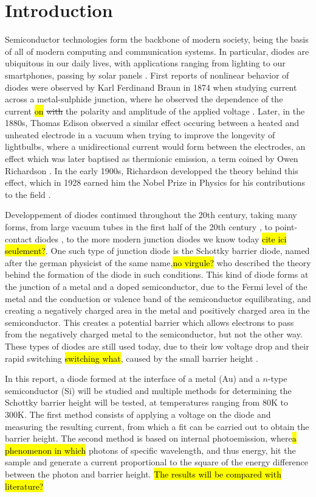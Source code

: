 \section{Introduction}
Semiconductor technologies form the backbone of modern society, being the basis of all of modern computing and communication systems.
In particular, diodes are ubiquitous in our daily lives, with applications ranging from lighting to our smartphones, passing by solar panels \cite{notice}. 
First reports of nonlinear behavior of diodes were observed by Karl Ferdinand Braun in 1874 when studying current across a metal-sulphide junction, where he observed the dependence of the current \hl{on} \st{with} the polarity and amplitude of the applied voltage \cite{braun_ueber_1875}.
Later, in the 1880s, Thomas Edison observed a similar effect occuring between a heated and unheated electrode in a vacuum when trying to improve the longevity of lightbulbs, where a unidirectional current would form between the electrodes, an effect which was later baptised as thermionic emission, a term coined by Owen Richardson \cite{da_rosa_chapter_2022}.
In the early 1900s, Richardson developped the theory behind this effect, which in 1928 earned him the Nobel Prize in Physics for his contributions to the field \cite{da_rosa_chapter_2022}.

Developpement of diodes continued throughout the 20th century, taking many forms, from large vacuum tubes in the first half of the 20th century \cite{bernardo_revision_2024}, to point-contact diodes \cite{bernardo_revision_2024}, to the more modern junction diodes we know today \hl{cite ici seulement?}.
One such type of junction diode is the Schottky barrier diode, named after the german physicist of the same name,\hl{no virgule?} who described the theory behind the formation of the diode in such conditions.
This kind of diode forms at the junction of a metal and a doped semiconductor, due to the Fermi level of the metal and the conduction or valence band of the semiconductor equilibrating, and creating a negatively charged area in the metal and positively charged area in the semiconductor.
This creates a potential barrier which allows electrons to pass from the negatively charged metal to the semiconductor, but not the other way.
These types of diodes are still used today, due to their low voltage drop and their rapid switching \hl{switching what}, caused by the small barrier height \cite{kent_walters_introduction_1997}.

In this report, a diode formed at the interface of a metal (Au) and a $n$-type semiconductor (Si) will be studied and multiple methods for determining the Schottky barrier height will be tested, at temperatures ranging from 80K to 300K. The first method consists of applying a voltage on the diode and measuring the resulting current, from which a fit can be carried out to obtain the barrier height. The second method is based on internal photoemission, where\hl{a phenomenon in which} photons of specific wavelength, and thus energy, hit the sample and generate a current proportional to the square of the energy difference between the photon and barrier height.
\hl{The results will be compared with literature?}